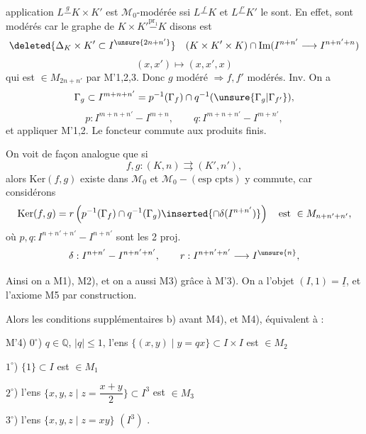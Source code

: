 application $L\mathrel{\overset{g}{-}}K\times K'$ est $\mathcal M_0$-modérée ssi $L\mathrel{\overset{f}{-}}K$ et $L\mathrel{\overset{f'}{-}}K'$ le sont. En effet, 
sont modérés car le graphe de $K\times K'\mathrel{\overset{\mathrm{pr}_1}{-}}K$ disons est
\[
\deleted{\Delta_K\times K'\subset I^{\unsure{2n+n'}}}\quad
(K\times K'\times K)\cap
\mathrm{Im}(I^{n+n'}\longrightarrow I^{n+n'+n})
\]
\[
(x,x')\longmapsto(x,x',x)
\]
qui est $\in M_{2n+n'}$ par M'1,2,3. Donc $g$ modéré $\Rightarrow f,f'$ modérés.
Inv. On a
\[
\Gamma_g\subset I^{m+n+n'}
=p^{-1}(\Gamma_f)\cap q^{-1}(\unsure{\Gamma_g|\Gamma_{f'}}),
\]
\[
p:I^{m+n+n'}-I^{m+n},\qquad q:I^{m+n+n'}-I^{m+n'},
\]
et appliquer M'1,2. Le foncteur   commute aux produits finis.

On voit de façon analogue que si
\[
f,g:(K,n)\rightrightarrows(K',n'),
\]
alors $\mathrm{Ker}(f,g)$ existe dans $\mathcal M_0$ et $\mathcal M_0-(\text{esp cpts})$ y commute, car considérons
\[
\mathrm{Ker}(f,g)=r\left(p^{-1}(\Gamma_f)\cap q^{-1}(\Gamma_g)
\inserted{\cap\delta(I^{n+n'})}\right)
\quad\text{est }\in M_{n+n'+n'},
\]
où $p,q:I^{n+n'+n'}-I^{n+n'}$ sont les 2 proj.
\[
\delta:I^{n+n'}-I^{n+n'+n'},\qquad
r:I^{n+n'+n'}\longrightarrow I^{\unsure{n}},
\]



Ainsi on a M1), M2), et on a aussi M3) grâce à M'3). On a l'objet $(I,1)=\underline I$,  et l'axiome M5 par construction.

Alors les conditions supplémentaires b) avant M4), et M4), équivalent à :

M'4) $0^\circ$)  $q\in\mathbb Q$, $|q|\leq1$, l'ens
$\{(x,y)\mid y=qx\}\subset I\times I$ est $\in M_2$

$1^\circ$)  $\{1\}\subset I$ est $\in M_1$

$2^\circ$) l'ens $\{x,y,z\mid z=\dfrac{x+y}{2}\}\subset I^3$ est $\in M_3$

$3^\circ$) l'ens $\{x,y,z\mid z=xy\}$ $(I^3)$ \text{---}.

